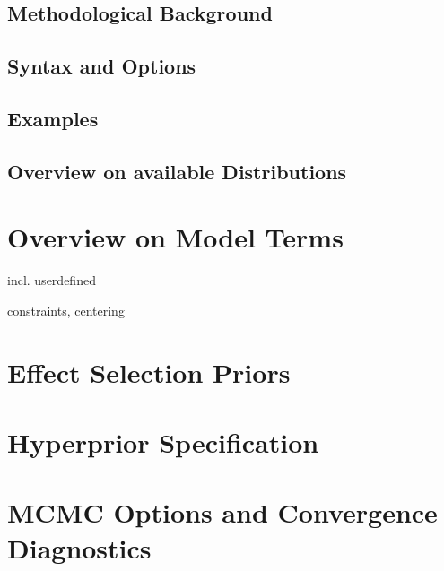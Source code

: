 \subsection{Methodological Background}

\subsection{Syntax and Options}

\subsection{Examples}

\subsection{Overview on available Distributions}
\label{mcmcreg_distributions}


\section{Overview on Model Terms}
\label{mcmcreg_modelterms}

incl. userdefined

constraints, centering

\section{Effect Selection Priors}

\section{Hyperprior Specification}

\section{MCMC Options and Convergence Diagnostics}


